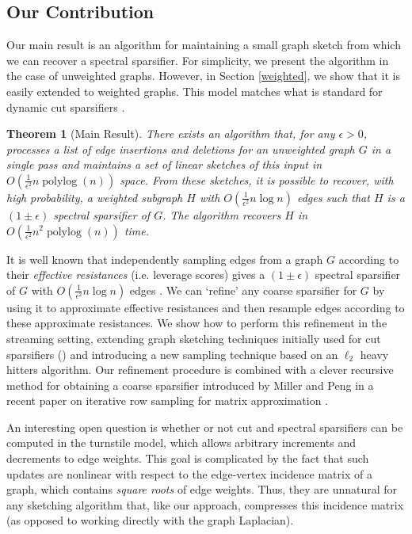 \documentclass[11pt]{article}
\newcommand{\plog}{\mathop\mathrm{polylog}}
\newtheorem{theorem}{Theorem}
\begin{document}
\subsection{Our Contribution}

Our main result is an algorithm for maintaining a small graph sketch from which we can recover a spectral sparsifier. For simplicity, we present the algorithm in the case of unweighted graphs. However, in Section \ref{weighted}, we show that it is easily extended to weighted graphs. This model matches what is standard for dynamic cut sparsifiers  \cite{gssss,goel2012single}. 

\begin{theorem}[Main Result]
\label{main_sparsification_theorem} There exists an algorithm that, for any $\epsilon > 0$, processes a  list of edge insertions and deletions for an unweighted graph $G$ in a single pass and maintains a set of linear sketches of this input in $O\left(\frac1{\epsilon^2} n \plog(n)\right)$ space. From these sketches, it is possible to recover, with high probability, a weighted subgraph $H$ with $O(\frac1{\epsilon^2}n\log n)$ edges such that $H$ is a $(1 \pm \epsilon)$ spectral sparsifier of $G$. The algorithm 
recovers $H$ in $O\left(\frac1{\epsilon^2}n^2 \plog (n)\right)$ time.
\end{theorem}

It is well known that independently sampling edges from a graph $G$ according to their \emph{effective resistances} (i.e. leverage scores) gives a $(1\pm \epsilon)$ spectral sparsifier of $G$ with $O(\frac1{\epsilon^2}n \log n)$ edges \cite{graphSparsificationEffectiveResistance}. We can `refine' any coarse sparsifier for $G$ by using it to approximate effective resistances and then resample edges according to these approximate resistances. We show how to perform this refinement in the streaming setting, extending graph sketching techniques initially used for cut sparsifiers (\cite{gssss,goel2012single}) and introducing a new sampling technique based on an $\ell_2$ heavy hitters algorithm. Our refinement procedure is combined with a clever recursive method for obtaining a coarse sparsifier introduced by Miller and Peng in a recent paper on iterative row sampling for matrix approximation \cite{pengV1}.

An interesting open question is whether or not cut and spectral sparsifiers can be computed in the turnstile model, which allows arbitrary increments and decrements to edge weights. This goal is complicated by the fact that such updates are nonlinear with respect to the edge-vertex incidence matrix of a graph, which contains \emph{square roots} of edge weights. Thus, they are unnatural for any sketching algorithm that, like our approach, compresses this incidence matrix (as opposed to working directly with the graph Laplacian).
\fi
\end{document}
